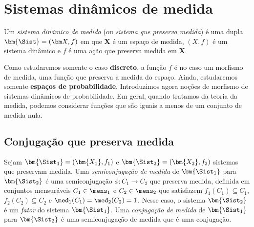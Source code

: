 \chapter{Sistemas dinâmicos de medida}

\begin{definition}
Um \emph{sistema dinâmico de medida} (ou \emph{sistema que preserva medida}) é uma dupla $\bm{\Sist}=(\bm X,f)$ em que $\bm X$ é um espaço de medida, $(X,f)$ é um sistema dinâmico e $f$ é uma ação que preserva medida em $\bm X$.
\end{definition}

Como estudaremos somente o caso \textbf{discreto}, a função $f$ é no caso um morfismo de medida, uma função que preserva a medida do espaço. Ainda, estudaremos somente \textbf{espaços de probabilidade}. Introduzimos agora noções de morfismo de sistemas dinâmicos de probabilidade. Em geral, quando tratamos da teoria da medida, podemos considerar funções que são iguais a menos de um conjunto de medida nula.

\section{Conjugação que preserva medida}

\begin{definition}
Sejam $\bm{\Sist_1} = (\bm{X_1},f_1)$ e $\bm{\Sist_2} = (\bm{X_2},f_2)$ sistemas que preservam medida. Uma \emph{semiconjugação de medida} de $\bm{\Sist_1}$ para $\bm{\Sist_2}$ é uma semiconjugação $\phi: C_1 \to C_2$ que preserva medida, definida em conjuntos mensuráveis $C_1 \in \mens_1$ e $C_2 \in \mens_2$ que satisfazem ${f_1}(C_1) \subseteq C_1$, ${f_2}(C_2) \subseteq C_2$ e $\med_1(C_1) = \med_2(C_2) = 1$. Nesse caso, o sistema $\bm{\Sist_2}$ é um \emph{fator} do sistema $\bm{\Sist_1}$. Uma \emph{conjugação de medida} de $\bm{\Sist_1}$ para $\bm{\Sist_2}$ é uma semiconjugação de medida que é uma conjugação.

\begin{figure}
\centering
{}
\end{figure}
\end{definition}

